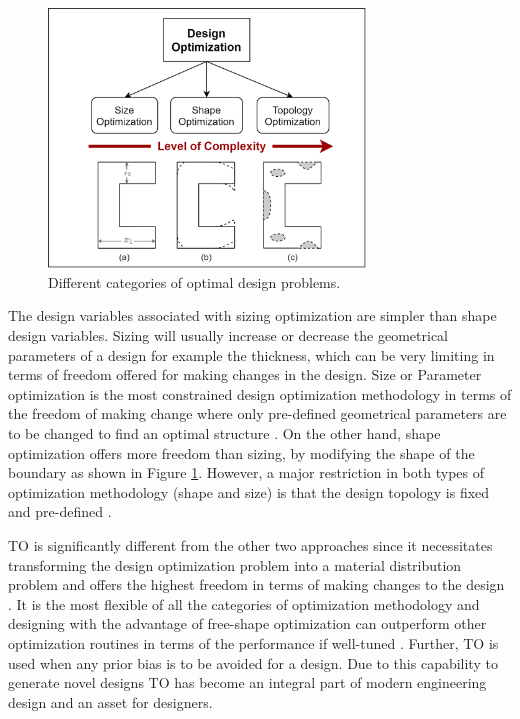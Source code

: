 \begin{figure}[h!]
    \centering
    \includegraphics[width=0.75\textwidth]{Figures/Ch_MDP/TO_Parameter_Shape_comparison.png}
    \caption{Different categories of optimal design problems.}
    \label{fig:MDP_size_shape_TO_comparison}
\end{figure}

The design variables associated with sizing optimization are simpler than shape design variables. Sizing will usually increase or decrease the geometrical parameters of a design for example the thickness, which can be very limiting in terms of freedom offered for making changes in the design. Size or Parameter optimization is the most constrained design optimization methodology in terms of the freedom of making change where only pre-defined geometrical parameters are to be changed to find an optimal structure \parencite{haftka1986structural}.
On the other hand, shape optimization offers more freedom than sizing, by modifying the shape of the boundary as shown in Figure \ref{fig:MDP_size_shape_TO_comparison}. However, a major restriction in both types of optimization methodology (shape and size) is that the design topology is fixed and pre-defined \parencite{bremicker1991integrated}.

TO is significantly different from the other two approaches since it necessitates transforming the design optimization problem into a material distribution problem and offers the highest freedom in terms of making changes to the design \parencite{lei2017review}. It is the most flexible of all the categories of optimization methodology and designing with the advantage of free-shape optimization can outperform other optimization routines in terms of the performance if well-tuned \parencite{garibaldi2019free, faria2015design}. Further, TO is used when any prior bias is to be avoided for a design. Due to this capability to generate novel designs TO has become an integral part of modern engineering design and an asset for designers.


